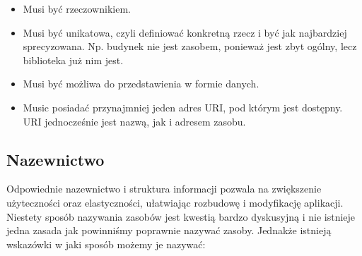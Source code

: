 \documentclass[oneside,polski,logo,indent]{amuthesis}
\begin{document}
\begin{itemize}
\item Musi być rzeczownikiem.
\item Musi być unikatowa, czyli definiować konkretną rzecz i być jak najbardziej sprecyzowana. Np. budynek nie jest zasobem, ponieważ jest zbyt ogólny, lecz biblioteka już nim jest. 
\item Musi być możliwa do przedstawienia w formie danych.
\item Music posiadać przynajmniej jeden adres URI, pod którym jest dostępny. URI jednocześnie jest nazwą, jak i adresem zasobu.\newline
\end{itemize}

\begin{center}
\subsection{Nazewnictwo}
\end{center}

Odpowiednie nazewnictwo i struktura informacji pozwala na zwiększenie użyteczności oraz elastyczności, ułatwiając rozbudowę i modyfikację aplikacji. Niestety sposób nazywania zasobów jest kwestią bardzo dyskusyjną i nie istnieje jedna zasada jak powinniśmy poprawnie nazywać zasoby. Jednakże istnieją wskazówki w jaki sposób możemy je nazywać:\newline
\end{document}
